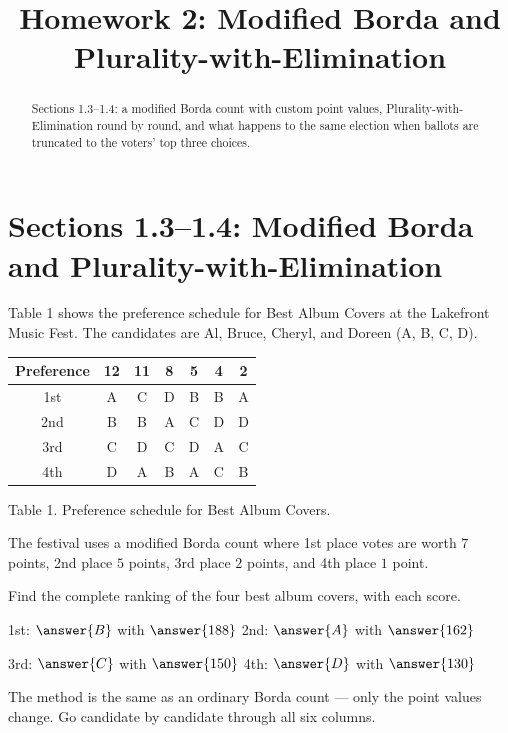 \documentclass[12pt]{ximera}
\title{Homework 2: Modified Borda and Plurality-with-Elimination}
\begin{document}
\begin{abstract}
Sections 1.3--1.4: a modified Borda count with custom point values, Plurality-with-Elimination
round by round, and what happens to the same election when ballots are truncated to
the voters' top three choices.
\end{abstract}
\maketitle

\section*{Sections 1.3--1.4: Modified Borda and Plurality-with-Elimination}

\begin{problem}
Table 1 shows the preference schedule for Best Album Covers at the Lakefront Music
Fest. The candidates are Al, Bruce, Cheryl, and Doreen (A, B, C, D).

\begin{center}
\begin{tabular}{c|cccccc}
Preference & 12 & 11 & 8 & 5 & 4 & 2 \\\hline
1st & A & C & D & B & B & A \\
2nd & B & B & A & C & D & D \\
3rd & C & D & C & D & A & C \\
4th & D & A & B & A & C & B
\end{tabular}

\smallskip
Table 1. Preference schedule for Best Album Covers.
\end{center}

The festival uses a modified Borda count where 1st place votes are worth $7$ points,
2nd place $5$ points, 3rd place $2$ points, and 4th place $1$ point.

\begin{prompt}
Find the complete ranking of the four best album covers, with each score.

1st: $\answer{B}$ with $\answer{188}$ \qquad
2nd: $\answer{A}$ with $\answer{162}$

\smallskip
3rd: $\answer{C}$ with $\answer{150}$ \qquad
4th: $\answer{D}$ with $\answer{130}$

\begin{hint}
The method is the same as an ordinary Borda count --- only the point values change.
Go candidate by candidate through all six columns.
\end{hint}


\end{prompt}
\end{problem}
\end{document}
